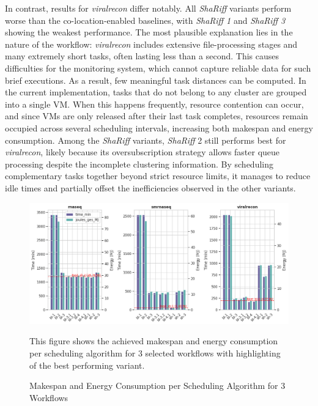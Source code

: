 In contrast, results for \textit{viralrecon} differ notably. All \textit{ShaRiff} variants perform worse than the co-location-enabled baselines, with \textit{ShaRiff 1} and \textit{ShaRiff 3} showing the weakest performance. The most plausible explanation lies in the nature of the workflow: \textit{viralrecon} includes extensive file-processing stages and many extremely short tasks, often lasting less than a second. This causes difficulties for the monitoring system, which cannot capture reliable data for such brief executions. As a result, few meaningful task distances can be computed. In the current implementation, tasks that do not belong to any cluster are grouped into a single VM. When this happens frequently, resource contention can occur, and since VMs are only released after their last task completes, resources remain occupied across several scheduling intervals, increasing both makespan and energy consumption.
Among the \textit{ShaRiff} variants, \textit{ShaRiff} 2 still performs best for \textit{viralrecon}, likely because its oversubscription strategy allows faster queue processing despite the incomplete clustering information. By scheduling complementary tasks together beyond strict resource limits, it manages to reduce idle times and partially offset the inefficiencies observed in the other variants.

\begin{figure}[H]
    \centering
    \includegraphics[scale=0.5]{fig/06/06-grouped-bar-3wfs.png}
    \small
    \caption{Makespan and Energy Consumption per Scheduling Algorithm for 3 Workflows}
    \label{fig:grouped_bar_3wfs}
    \tiny
    This figure shows the achieved makespan and energy consumption per scheduling algorithm for 3 selected workflows with highlighting of the best performing variant.
\end{figure}

